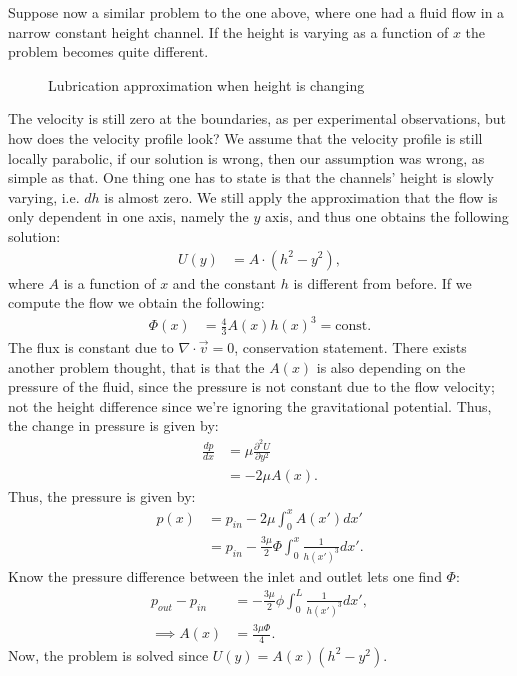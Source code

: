 \documentclass[a4paper]{article}
\begin{document}
\vspace*{0.5cm}\noindent
Suppose now a similar problem to the one above, where one had a fluid flow in a narrow constant height channel. If the height is varying as a function of $x$ the problem becomes quite different.
\begin{figure}[H]
    \centering
    \caption{Lubrication approximation when height is changing}
    \label{fig: Lubrication approximation height change}
\end{figure}\noindent
The velocity is still zero at the boundaries, as per experimental observations, but how does the velocity profile look?
We assume that the velocity profile is still locally parabolic, if our solution is wrong, then our assumption was wrong, as simple as that.
One thing one has to state is that the channels' height is slowly varying, i.e. $dh$ is almost zero. We still apply the approximation that the flow is only dependent in one axis, namely the $y$ axis, and thus one obtains the following solution:
\begin{align*}
    U(y) &= A\cdot\left(h^2 -y^2\right),
\end{align*}where $A$ is a function of $x$ and the constant $h$ is different from before. If we compute the flow we obtain the following:
\begin{align*}
    \Phi(x) &= \frac{4}{3}A(x)h(x)^3 = \text{const}.
\end{align*}The flux is constant due to $\nabla\cdot\vec{v} = 0$, conservation statement. There exists another problem thought, that is that the $A(x)$ is also depending on the pressure of the fluid, since the pressure is not constant due to the flow velocity; not the height difference since we're ignoring the gravitational potential.
Thus, the change in pressure is given by:
\begin{align*}
    \frac{d p}{d x} &= \mu\frac{\partial^2 U}{\partial y^2}\\
    &=-2\mu A(x).
\end{align*}Thus, the pressure is given by:
\begin{align*}
    p(x) &= p_{in} - 2\mu\int_0^x A(x')dx'\\
    &= p_{in} - \frac{3\mu}{2}\Phi\int_0^x\frac{1}{h(x')^3}dx'.
\end{align*}Know the pressure difference between the inlet and outlet lets one find $\Phi$:
\begin{align*}
    p_{out} - p_{in} &= - \frac{3\mu}{2}\phi\int_0^L\frac{1}{h(x')^3}dx',\\
    \implies A(x) &= \frac{3\mu\Phi}{4}.
\end{align*}Now, the problem is solved since $U(y) = A(x)(h^2 - y^2)$.
\end{document}
